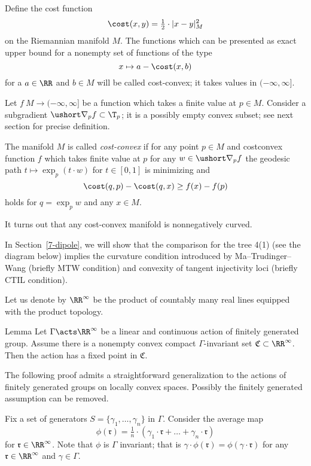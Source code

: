 Define the cost function
\[\cost(x,y)=\tfrac12\cdot|x-y|_M^2\]
on the Riemannian manifold $M$.
The functions which can be presented as exact upper bound for a nonempty set of functions of the type 
\[x\mapsto a- \cost(x,b)\]
for a $a\in \RR$ and $b\in M$ will be called cost-convex;
it takes values in $(-\infty,\infty]$.

Let $f\:M\to (-\infty,\infty]$ be a function which takes a finite value at $p\in M$.
Consider a subgradient $\ushort\nabla_pf\subset \T_p$; it is a possibly empty convex subset; see next section for precise definition.

The manifold $M$ is called \emph{cost-convex} if for any point $p\in M$ and costconvex function $f$ which takes finite value at $p$ for any $w\in\ushort\nabla_pf$ the geodesic path $t\mapsto \exp_p(t\cdot w)$ for $t\in [0,1]$ is minimizing
and 
\[\cost(q,p)-\cost(q,x)\ge f(x)-f(p)\]
holds for $q=\exp_pw$ and any $x\in M$.

It turns out that any cost-convex manifold is nonnegatively curved.

In Section~\ref{7-dipole}, we will show that the comparison for the tree 4(1) (see the diagram below) implies
the curvature condition introduced by Ma--Trudinger--Wang (briefly MTW condition) and convexity of tangent injectivity loci (briefly CTIL condition).














Let us denote by $\RR^\infty$ be the product of countably many real lines equipped with the product topology.

\begin{thm}{Lemma}\label{lem:tikhonov}
Let $\Gamma\acts \RR^\infty$ be a linear and continuous action of finitely generated group.
Assume there is a nonempty convex compact $\Gamma$-invariant set $\mathfrak{C}\subset \RR^\infty$.
Then the action has a fixed point in $\mathfrak{C}$.
\end{thm}

The following proof admits a straightforward generalization to the actions of finitely generated groups on locally convex spaces.
Possibly the finitely generated assumption can be removed.

Fix a set of generators $S=\{\gamma_1,\dots,\gamma_n\}$ in $\Gamma$.
Consider the average map
\[\phi(\mathfrak{r})=\tfrac1{n}\cdot(\gamma_1\cdot \mathfrak{r}+\dots+\gamma_n\cdot \mathfrak{r})\]
for $\mathfrak{r}\in\RR^\infty$.
Note that $\phi$ is $\Gamma$ invariant;
that is $\gamma\cdot \phi(\mathfrak{r})=\phi(\gamma\cdot\mathfrak{r})$ for any $\mathfrak{r}\in\RR^\infty$ and $\gamma\in \Gamma$.


